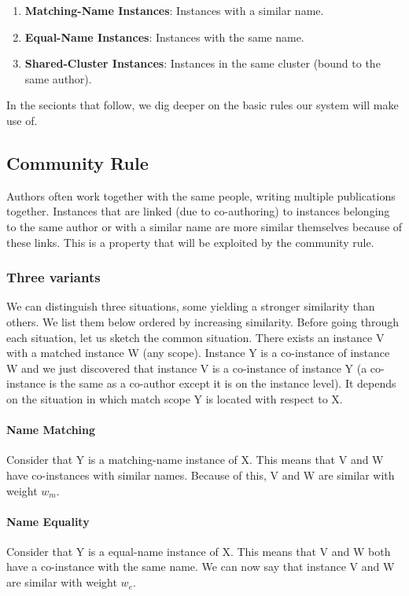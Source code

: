 \begin{enumerate}
\item \textbf{Matching-Name Instances}: Instances with a similar name.
\item \textbf{Equal-Name Instances}: Instances with the same name.
\item \textbf{Shared-Cluster Instances}: Instances in the same cluster (bound to the same author).
\end{enumerate}

In the secionts that follow, we dig deeper on the basic rules our system will make use of.

\subsection{Community Rule}

Authors often work together with the same people, writing multiple publications together. Instances that are linked (due to co-authoring) to instances belonging to the same author or with a similar name are more similar themselves because of these links. This is a property that will be exploited by the community rule. 

\subsubsection{Three variants}

We can distinguish three situations, some yielding a stronger similarity than others. We list them below ordered by increasing similarity. Before going through each situation, let us sketch the common situation. There exists an instance V with a matched instance W (any scope). Instance Y is a co-instance of instance W and we just discovered that instance V is a co-instance of instance Y (a co-instance is the same as a co-author except it is on the instance level). It depends on the situation in which match scope Y is located with respect to X.

\paragraph{Name Matching} Consider that Y is a matching-name instance of X. This means that V and W have co-instances with similar names. Because of this, V and W are similar with weight $w_m$.

\paragraph{Name Equality} Consider that Y is a equal-name instance of X. This means that V and W both have a co-instance with the same name. We can now say that instance V and W are similar with weight $w_e$.

